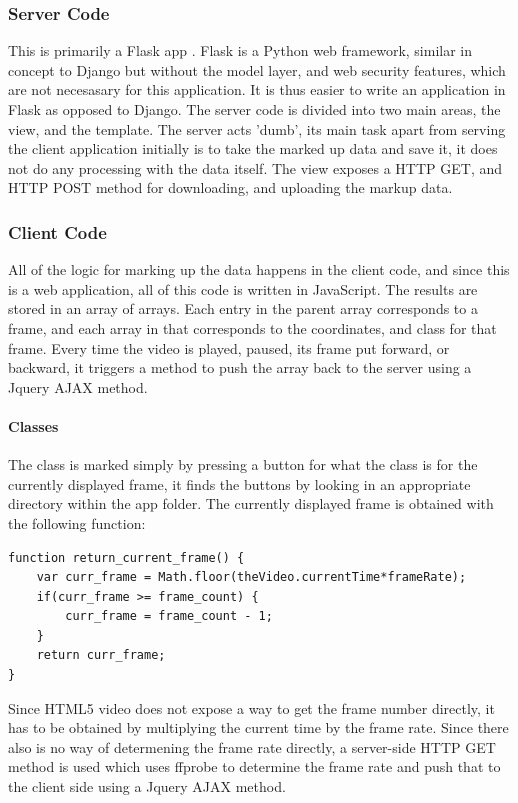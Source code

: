         \subsubsection{Server Code}
        This is primarily a Flask app \cite{flaskpocoo}. Flask is a Python web framework, similar in concept to Django but without the model layer, and web security features, which are not necesasary for this application. It is thus easier to write an application in Flask as opposed to Django. The server code is divided into two main areas, the view, and the template. The server acts 'dumb', its main task apart from serving the client application initially is to take the marked up data and save it, it does not do any processing with the data itself. The view exposes a HTTP GET, and HTTP POST method for downloading, and uploading the markup data.

        \subsubsection{Client Code}
        All of the logic for marking up the data happens in the client code, and since this is a web application, all of this code is written in JavaScript. The results are stored in an array of arrays. Each entry in the parent array corresponds to a frame, and each array in that corresponds to the coordinates, and class for that frame. Every time the video is played, paused, its frame put forward, or backward, it triggers a method to push the array back to the server using a Jquery AJAX method.

            \paragraph{Classes}
            The class is marked simply by pressing a button for what the class is for the currently displayed frame, it finds the buttons by looking in an appropriate directory within the app folder. The currently displayed frame is obtained with the following function:
                \begin{lstlisting}[style=JSStyle]
function return_current_frame() {
    var curr_frame = Math.floor(theVideo.currentTime*frameRate);
    if(curr_frame >= frame_count) {
        curr_frame = frame_count - 1;
    }
    return curr_frame;
}\end{lstlisting} 
            Since HTML5 video does not expose a way to get the frame number directly, it has to be obtained by multiplying the current time by the frame rate. Since there also is no way of determening the frame rate directly, a server-side HTTP GET method is used which uses ffprobe to determine the frame rate and push that to the client side using a Jquery AJAX method.

